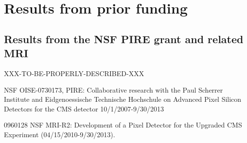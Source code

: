 
\section{Results from prior funding}

\subsection{Results from the NSF PIRE grant and related MRI}

XXX-TO-BE-PROPERLY-DESCRIBED-XXX

NSF OISE-0730173, PIRE: Collaborative research with the Paul Scherrer
Institute and Eidgenoessische Technische Hochschule on Advanced Pixel
Silicon Detectors for the CMS detector 10/1/2007-9/30/2013

0960128 NSF MRI-R2: Development of a Pixel Detector for the Upgraded
CMS Experiment (04/15/2010-9/30/2013).
